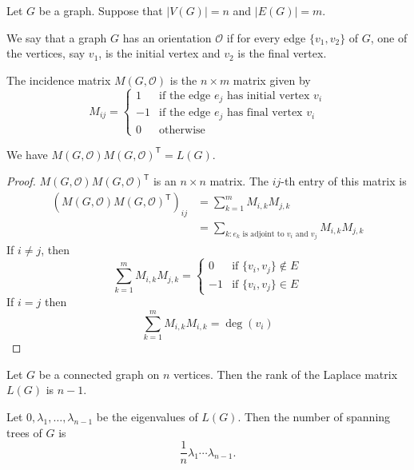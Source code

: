 Let $G$ be a graph. Suppose that $|V(G)|=n$ and $|E(G)|=m$. 
\begin{definition}
We say that a graph $G$ has an orientation $\mathcal{O}$ if for every edge $\{ v_{1},v_{2} \}$ of $G$, one of the vertices, say $v_{1}$, is the initial vertex and $v_{2}$ is the final vertex.
\end{definition}
\begin{definition}
The incidence matrix $M(G,\mathcal{O})$ is the $n\times m$ matrix given by
$$
M_{ij}=\begin{cases}
1 & \text{if the edge }e_{j}\text{ has initial vertex }v_{i} \\
-1 & \text{if the edge }e_{j}\text{ has final vertex }v_{i} \\
0 & \text{otherwise}  
\end{cases}
$$
\end{definition}
\begin{lemma}
We have $M(G,\mathcal{O})M(G,\mathcal{O})^{\mathsf{T}}=L(G)$.
\end{lemma}
\begin{proof}
$M(G,\mathcal{O})M(G,\mathcal{O})^{\mathsf{T}}$ is an $n\times n$ matrix. The $ij$-th entry of this matrix is
\begin{align*}
(M(G,\mathcal{O})M(G,\mathcal{O})^{\mathsf{T}})_{ij} & =\sum_{k=1}^{m} M_{i,k}M_{j,k} \\
 & =\sum _{k:e_{k}\text{ is adjoint to }v_{i}\text{ and }v_{j}} M_{i,k}M_{j,k}
\end{align*}
If $i\neq j$, then
$$
\sum_{k=1}^{m} M_{i,k}M_{j,k}=\begin{cases}
0 & \text{if }\{ v_{i},v_{j} \}\not\in E \\
-1 &  \text{if }\{ v_{i},v_{j} \}\in E
\end{cases}
$$
If $i=j$ then 
$$
\sum_{k=1}^{m} M_{i,k}M_{i,k}=\deg(v_{i}) 
$$
\end{proof}
\begin{theorem}[Kirchhoff]\label{kirchhoff}
Let $G$ be a connected graph on $n$ vertices. Then the rank of the Laplace matrix $L(G)$ is $n-1$.

Let $0,\lambda_{1},\dots,\lambda _{n-1}$ be the eigenvalues of $L(G)$. Then the number of spanning trees of $G$ is
$$
\frac{1}{n}\lambda_{1}\cdots\lambda _{n-1}.
$$

\end{theorem}